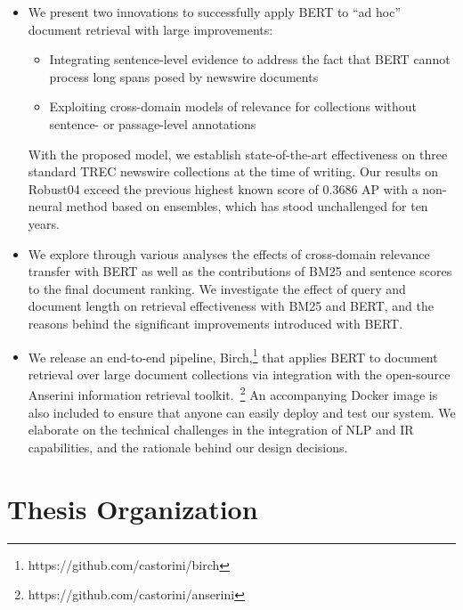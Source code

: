\begin{itemize}
	\item
	We present two innovations to successfully apply BERT to ``ad hoc'' document retrieval 	with large improvements:\
	\begin{itemize}
		\item Integrating sentence-level evidence to address the fact that BERT cannot process long spans posed by newswire documents
		\item Exploiting cross-domain models of relevance for collections without sentence- or passage-level annotations
	\end{itemize}
	With the proposed model, we establish state-of-the-art effectiveness on three standard TREC newswire collections at the time of writing.
	Our results on Robust04 exceed the previous highest known score of 0.3686 AP \cite{Cormack:2009:RRF:1571941.1572114} with a non-neural method based on ensembles, which has stood unchallenged for ten years.

	\item
	We explore through various analyses the effects of cross-domain relevance transfer with BERT as well as the contributions of BM25 and sentence scores to the final document ranking.
	We investigate the effect of query and document length on retrieval effectiveness with BM25 and BERT, and the reasons behind the significant improvements introduced with BERT.

	\item
	We release an end-to-end pipeline, Birch,\footnote{https://github.com/castorini/birch} that applies BERT to document retrieval over large document collections via integration with the open-source Anserini information retrieval toolkit.~\footnote{https://github.com/castorini/anserini}
	An accompanying Docker image is also included to ensure that anyone can easily deploy and test our system.
	We elaborate on the technical challenges in the integration of NLP and IR capabilities, and the rationale behind our design decisions.
\end{itemize}

\newpage

\section{Thesis Organization}

